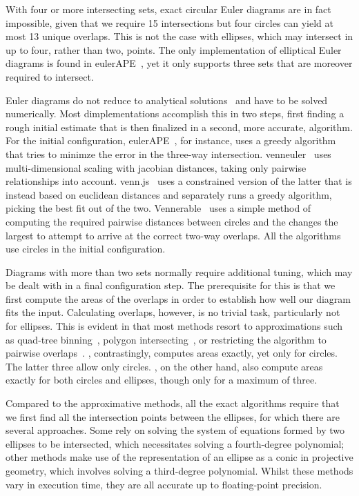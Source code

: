 \documentclass[
  a4paper,
  nofonts,
  nobib,
  nohyper,
  openany
]{tufte-book}\usepackage[]{graphicx}\usepackage[]{color}
\newcommand{\pkg}[1]{{\fontseries{b}\selectfont #1}}
\begin{document}
With four or more intersecting sets, exact circular Euler diagrams are in fact impossible, given that we require 15 intersections but four circles can yield at most 13 unique overlaps. This is not the case with ellipses, which may intersect in up to four, rather than two, points. The only implementation of elliptical Euler diagrams is found in \pkg{eulerAPE}~\citep{micallef_2014}, yet it only supports three sets that are moreover required to intersect.

Euler diagrams do not reduce to analytical solutions~\citep{chow_2007} and have to be solved numerically. Most dimplementations accomplish this in two steps, first finding a rough initial estimate that is then finalized in a second, more accurate, algorithm. For the initial configuration, \pkg{eulerAPE}~\citep{micallef_2013}, for instance, uses a greedy algorithm that tries to minimze the error in the three-way intersection. \pkg{venneuler}~\citep{wilkinson_2012} uses multi-dimensional scaling with jacobian distances, taking only pairwise relationships into account. \pkg{venn.js}~\citet{frederickson_2016} uses a constrained version of the latter that is instead based on euclidean distances and separately runs a greedy algorithm, picking the best fit out of the two. \pkg{Vennerable}~\citet{swinton_2011} uses a simple method of computing the required pairwise distances between circles and the changes the largest to attempt to arrive at the correct two-way overlaps. All the algorithms use circles in the initial configuration.

Diagrams with more than two sets normally require additional tuning, which may be dealt with in a final configuration step. The prerequisite for this is that we first compute the areas of the overlaps in order to establish how well our diagram fits the input. Calculating overlaps, however, is no trivial task, particularly not for ellipses. This is evident in that most methods resort to approximations such as quad-tree binning~\citep{wilkinson_2012}, polygon intersecting~\citep{kestler_2008}, or restricting the algorithm to pairwise overlaps~\citep{swiniton_2011}. \citet{frederickson_2016}, contrastingly, computes areas exactly, yet only for circles. The latter three allow only circles. \citet{micallef_2013}, on the other hand, also compute areas exactly for both circles and ellipses, though only for a maximum of three.

Compared to the approximative methods, all the exact algorithms require that we first find all the intersection points between the ellipses, for which there are several approaches. Some rely on solving the system of equations formed by two ellipses to be intersected, which necessitates solving a fourth-degree polynomial; other methods make use of the representation of an ellipse as a conic in projective geometry, which involves solving a third-degree polynomial. Whilst these methods vary in execution time, they are all accurate up to floating-point precision.
\end{document}
